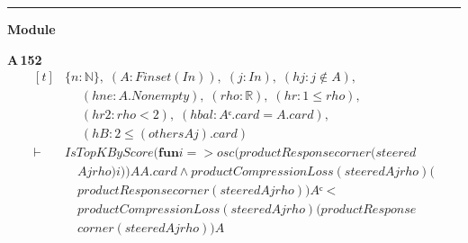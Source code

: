 \vspace{4pt}\noindent\rule{\columnwidth}{0.4pt}\par\vspace{2pt}
\noindent\textbf{Module }\par\vspace{3pt}

\noindent\textbf{A\,152}\quad{}
{\footnotesize\[ \begin{aligned}[t]
&\{ \mathit{n} : \mathbb{N} \},\; (\mathit{A} : \mathit{Finset} (\mathit{I} \mathit{n})),\; (\mathit{j} : \mathit{I} \mathit{n}),\; (\mathit{hj} : \mathit{j} \notin \mathit{A}),\\
&\quad \; (\mathit{hne} : \mathit{A}.\mathit{Nonempty}),\; (\mathit{rho} : \mathbb{R} ),\; (\mathit{hr} : 1 \leq \mathit{rho}),\\
&\quad \; (\mathit{hr2} : \mathit{rho} < 2),\; (\mathit{hbal} : \mathit{Aᶜ}.\mathit{card}=\mathit{A}.\mathit{card}),\\
&\quad \; (\mathit{hB} : 2 \leq (\mathit{others} \mathit{A} \mathit{j}).\mathit{card})\\
\vdash\;&\mathit{IsTopKByScore} (\mathbf{fun} \mathit{i} => \mathit{osc} (\mathit{productResponse} \mathit{corner} (\mathit{steered}\\
&\quad \mathit{A} \mathit{j} \mathit{rho}) \mathit{i})) \mathit{A} \mathit{A}.\mathit{card} \wedge \mathit{productCompressionLoss} (\mathit{steered} \mathit{A} \mathit{j} \mathit{rho}) (\\
&\quad \mathit{productResponse} \mathit{corner} (\mathit{steered} \mathit{A} \mathit{j} \mathit{rho})) \mathit{Aᶜ} <\\
&\quad \mathit{productCompressionLoss} (\mathit{steered} \mathit{A} \mathit{j} \mathit{rho}) (\mathit{productResponse}\\
&\quad \mathit{corner} (\mathit{steered} \mathit{A} \mathit{j} \mathit{rho})) \mathit{A}
\end{aligned} \]}

